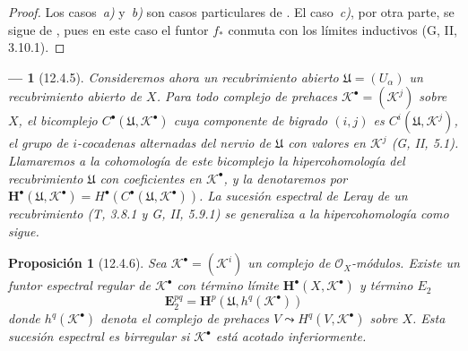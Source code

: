 \documentclass[10pt,oneside,openany]{book}
\theoremstyle{egaenv}\newtheorem*{env}{---}
\theoremstyle{egastatement}
\newtheorem*{proposition}{Proposición}
\theoremstyle{egadescription}
\begin{document}
\begin{proof}
Los casos~\emph{a)} y~\emph{b)} son casos particulares de .
El caso~\emph{c)}, por otra parte, se sigue de , pues en
este caso el funtor $f_*$ conmuta con los límites inductivos
(G, II, 3.10.1).
\end{proof}

\begin{env}[12.4.5]
\label{0.12.4.5-fr}
Consideremos ahora un recubrimiento abierto $\mathfrak U=(U_\alpha)$ un recubrimiento abierto de $X$.
Para todo complejo de \emph{prehaces}
$\mathcal K^\bullet=(\mathcal K^j)$ sobre $X$, el bicomplejo $C^\bullet(\mathfrak U,\mathcal K^\bullet)$ cuya
componente de bigrado $(i,j)$ es
$C^i(\mathfrak U,\mathcal K^j)$, el grupo de
$i$-cocadenas alternadas del nervio de $\mathfrak U$ con valores
en $\mathcal K^j$ (G, II, 5.1).
Llamaremos a la cohomología de este bicomplejo la
\emph{hipercohomología} del recubrimiento $\mathfrak U$ con
coeficientes en $\mathcal K^\bullet$, y la denotaremos por
$\mathbf H^\bullet(\mathfrak U,\mathcal K^\bullet)=H^\bullet(C^\bullet(\mathfrak U,\mathcal K^\bullet))$.
La sucesión espectral de Leray de un recubrimiento
(T, 3.8.1 y G, II, 5.9.1) se generaliza a la hipercohomología como sigue.
\end{env}

\begin{proposition}[12.4.6]
\label{0.12.4.6}
\label{0.12.4.6-fr}
Sea $\mathcal K^\bullet=(\mathcal K^i)$ un complejo de
$\mathcal O_X$-módulos.
Existe un funtor espectral regular de $\mathcal K^\bullet$ con
término límite $\mathbf H^\bullet(X,\mathcal K^\bullet)$ y término $E_2$
\begin{equation}
\label{0.12.4.6.1-fr}
\tag{12.4.6.1}
\mathbf{E}_2^{pq}=\mathbf H^p(\mathfrak U,h^q(\mathcal K^\bullet))
\end{equation}
donde $h^q(\mathcal K^\bullet)$ denota el complejo de prehaces
$V\leadsto H^q(V,\mathcal K^\bullet)$
sobre $X$.
Esta sucesión espectral es birregular si $\mathcal K^\bullet$ está acotado inferiormente.
\end{proposition}
\end{document}

